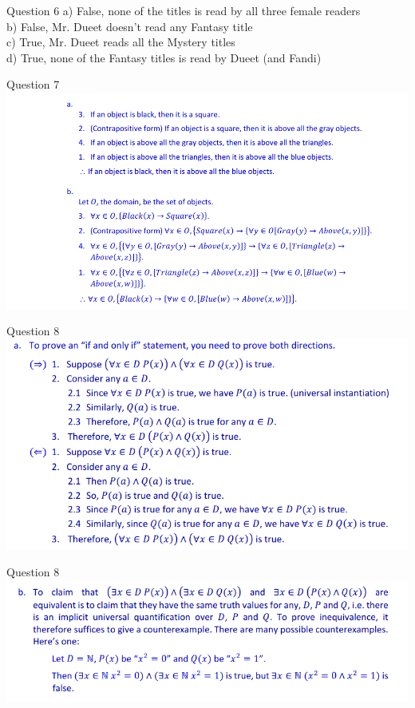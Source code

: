 \documentclass[10pt]{beamer}
\begin{document}
\begin{frame}[fragile]{Question 6}
a) False, none of the titles is read by all three female readers \\
b) False, Mr. Dueet doesn't read any Fantasy title \\
c) True, Mr. Dueet reads all the Mystery titles \\
d) True, none of the Fantasy titles is read by Dueet (and Fandi)
\end{frame}

\begin{frame}[fragile]{Question 7}
\includegraphics[width=\textwidth]{7.png}
\end{frame}

\begin{frame}[fragile]{Question 8}
\includegraphics[width=\textwidth]{8a.png}
\end{frame}

\begin{frame}[fragile]{Question 8}
\includegraphics[width=\textwidth]{8b.png}
\end{frame}
\end{document}
